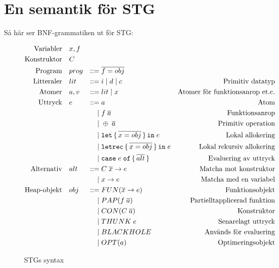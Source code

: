 \documentclass[../Core]{subfiles}
\begin{document}
\section{En semantik för STG}
\label{sec:SemStg}






Så här ser BNF-grammatiken ut för STG:

\begin{figure}[H]
\begin{equation*}
\begin{aligned}
\text{Variabler} \quad & x,f \\
\text{Konstruktor} \quad & C \\
\text{Program}\quad&prog&::=&\;\overline{f=obj}&\text{} \\
\text{Litteraler}\quad&lit&::=&\;i \; | \;  d \;|\; c&\text{Primitiv datatyp} \\
\text{Atomer}\quad&a, v&::=&\;lit \; | \; x&\text{Atomer för funktionsanrop et.c.} \\
\text{Uttryck}\quad&e&::=&\;a&\text{Atom} \\
    &&|&\;f \; \overline{a}&\text{Funktionsanrop} \\
    &&|&\;\oplus \; \overline{a}&\text{Primitiv operation} \\
    &&|&\;\mathtt{let \, \{} \, \overline{x = obj} \, \mathtt{ \} \, in } \; e&\text{Lokal allokering} \\
    &&|&\;\mathtt{letrec \, \{} \, \overline{x = obj} \, \mathtt{ \} \, in } \; e&\text{Lokal rekursiv allokering} \\
    &&|&\;\mathtt{case} \; e \;  \mathtt{ of \, \{ } \, \overline{alt} \, \mathtt{\}}&\text{Evaluering av uttryck} \\
\text{Alternativ}\quad&alt&::=&\;C \; \overline{x} \rightarrow e&\text{Matcha mot konstruktor} \\
    &&|&\;x \rightarrow e&\text{Matcha med en variabel} \\
\text{Heap-objekt}\quad&obj&::=&\;FUN(\overline{x} \rightarrow e)&\text{Funktionsobjekt} \\
    &&|&\;PAP(f \; \overline{a})&\text{Partielltapplicerad funktion} \\
    &&|&\;CON(C \; \overline{a})&\text{Konstruktor} \\
    &&|&\;THUNK \; e&\text{Senarelagt uttryck} \\
    &&|&\;BLACKHOLE&\text{Används för evaluering} \\
    &&|&\;OPT(a)&\text{Optimeringsobjekt}
\end{aligned}
\end{equation*}
\caption{STGs syntax}
\end{figure}
\end{document}
